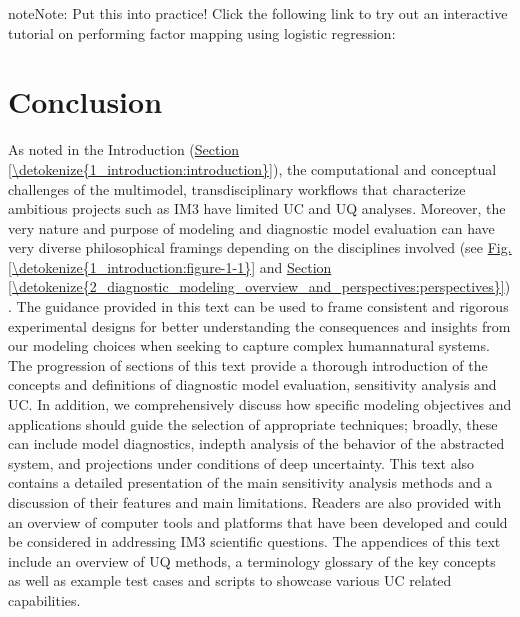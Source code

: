 \documentclass[letterpaper,10pt,english]{book}
\begin{document}
\begin{sphinxadmonition}{note}{Note:}
\sphinxAtStartPar
Put this into practice! Click the following link to try out an interactive tutorial on performing factor mapping using logistic regression:  
\end{sphinxadmonition}


\chapter{Conclusion}
\label{\detokenize{5_conclusion:conclusion}}\label{\detokenize{5_conclusion:id1}}\label{\detokenize{5_conclusion::doc}}
\sphinxAtStartPar
As noted in the Introduction (\hyperref[\detokenize{1_introduction:introduction}]{Section \ref{\detokenize{1_introduction:introduction}}}), the computational and conceptual challenges of the multi\sphinxhyphen{}model, transdisciplinary workflows that characterize ambitious projects such as IM3 have limited UC and UQ analyses. Moreover, the very nature and purpose of modeling and diagnostic model evaluation can have very diverse philosophical framings depending on the disciplines involved (see \hyperref[\detokenize{1_introduction:figure-1-1}]{Fig.\@ \ref{\detokenize{1_introduction:figure-1-1}}} and \hyperref[\detokenize{2_diagnostic_modeling_overview_and_perspectives:perspectives}]{Section \ref{\detokenize{2_diagnostic_modeling_overview_and_perspectives:perspectives}}}). The guidance provided in this text can be used to frame consistent and rigorous experimental designs for better understanding the consequences and insights from our modeling choices when seeking to capture complex human\sphinxhyphen{}natural systems. The progression of sections of this text provide a thorough introduction of the concepts and definitions of diagnostic model evaluation, sensitivity analysis and UC. In addition, we comprehensively discuss how specific modeling objectives and applications should guide the selection of appropriate techniques; broadly, these can include model diagnostics, in\sphinxhyphen{}depth analysis of the behavior of the abstracted system, and projections under conditions of deep uncertainty. This text also contains a detailed presentation of the main sensitivity analysis methods and a discussion of their features and main limitations. Readers are also provided with an overview of computer tools and platforms that have been developed and could be considered in addressing IM3 scientific questions. The appendices of this text include an overview of UQ methods, a terminology glossary of the key concepts as well as example test cases and scripts to showcase various UC related capabilities.
\end{document}
